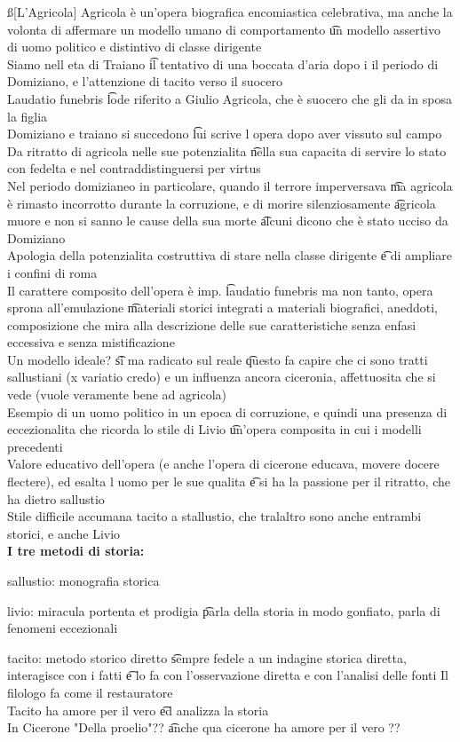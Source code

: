 \documentclass[12pt]{article}
\begin{document}
\ss[L'Agricola]
Agricola è un'opera biografica encomiastica celebrativa, ma anche la volonta di affermare un modello umano di comportamento \t un modello assertivo di uomo politico e distintivo di classe dirigente \\
Siamo nell eta di Traiano \t il tentativo di una boccata d'aria dopo i il periodo di Domiziano, e l'attenzione di tacito verso il suocero \\
Laudatio funebris \t lode riferito a Giulio Agricola, che è suocero che gli da in sposa la figlia \\
Domiziano e traiano si succedono \t lui scrive l opera dopo aver vissuto sul campo \\
Da ritratto di agricola nelle sue potenzialita \t nella sua capacita di servire lo stato con fedelta e nel contraddistinguersi per virtus \\
Nel periodo domizianeo in particolare, quando il terrore imperversava \t ma agricola è rimasto incorrotto durante la corruzione, e di morire silenziosamente \t agricola muore e non si sanno le cause della sua morte \t alcuni dicono che è stato ucciso da Domiziano \\
Apologia della potenzialita costruttiva di stare nella classe dirigente \t e di ampliare i confini di roma \\
Il carattere composito dell'opera è imp. \t laudatio funebris ma non tanto, opera sprona all'emulazione \t materiali storici integrati a materiali biografici, aneddoti, composizione che mira alla descrizione delle sue caratteristiche senza enfasi eccessiva e senza mistificazione \\
Un modello ideale? \t si ma radicato sul reale \t questo fa capire che ci sono tratti sallustiani (x variatio credo) e un influenza ancora ciceronia, affettuosita che si vede (vuole veramente bene ad agricola) \\
Esempio di un uomo politico in un epoca di corruzione, e quindi una presenza di eccezionalita che ricorda lo stile di Livio \t un'opera composita in cui i modelli precedenti \\
Valore educativo dell'opera (e anche l'opera di cicerone educava, movere docere flectere), ed esalta l uomo per le sue qualita \t e si ha la passione per il ritratto, che ha dietro sallustio \\
Stile difficile accumana tacito a stallustio, che tralaltro sono anche entrambi storici, e anche Livio \\
\textbf{I tre metodi di storia:}
\bi
  \item sallustio: monografia storica
  \item livio: miracula portenta et prodigia \t parla della storia in modo gonfiato, parla di fenomeni eccezionali
  \item tacito: metodo storico diretto \t sempre fedele a un indagine storica diretta, interagisce con i fatti \t e lo fa con l'osservazione diretta e con l'analisi delle fonti
\ei
Il filologo fa come il restauratore \\
Tacito ha amore per il vero \t ed analizza la storia \\
In Cicerone "Della proelio"?? \t anche qua cicerone ha amore per il vero ??
\end{document}
